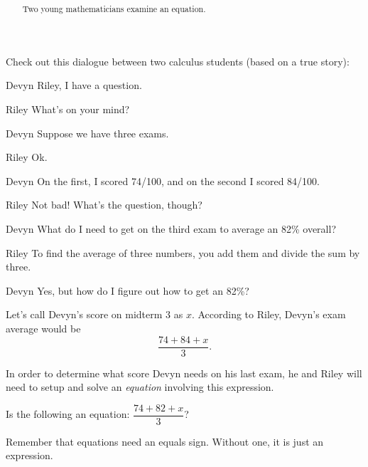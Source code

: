\documentclass{ximera}
\title[Break-Ground:]{  }
\begin{document}
\begin{abstract}
  Two young mathematicians examine an equation.
\end{abstract}
\maketitle

Check out this dialogue between two calculus students (based on a true
story):

\begin{dialogue}
	\item[Devyn] Riley, I have a question.
	\item[Riley] What's on your mind?
	\item[Devyn] Suppose we have three exams.  
	\item[Riley]  Ok. 
	\item[Devyn] On the first, I scored 74/100, and on the second I scored 84/100.
	\item[Riley] Not bad!  What's the question, though?
	\item[Devyn] What do I need to get on the third exam to average an 82\% overall?
	\item[Riley] To find the average of three numbers, you add them and divide the sum by three.
	\item[Devyn] Yes, but how do I figure out how to get an 82\%?
\end{dialogue}

Let's call Devyn's score on midterm 3 as $x$.  According to Riley, Devyn's exam average
would be \[ \frac{74 + 84 + x}{3}. \]

In order to determine what score Devyn needs on his last exam, he and Riley will need to setup and solve an \emph{equation} involving this expression.


\begin{problem}
  Is the following an equation: $\displaystyle \dfrac{74 + 82 + x}{3}$?

  \begin{multipleChoice}
  \end{multipleChoice}

  \begin{feedback}
  Remember that equations need an equals sign.  Without one, it is just an expression.  
  \end{feedback}
\end{problem}



\end{document}
